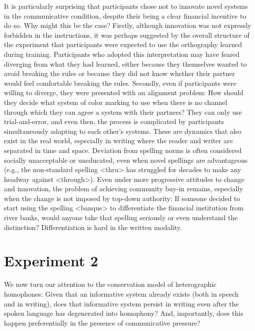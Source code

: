 \documentclass[doc,biblatex]{apa7}
\begin{document}
It is particularly surprising that participants chose not to innovate novel systems in the communicative condition, despite their being a clear financial incentive to do so. Why might this be the case? Firstly, although innovation was not expressly forbidden in the instructions, it was perhaps suggested by the overall structure of the experiment that participants were expected to use the orthography learned during training. Participants who adopted this interpretation may have feared diverging from what they had learned, either because they themselves wanted to avoid breaking the rules or because they did not know whether their partner would feel comfortable breaking the rules. Secondly, even if participants were willing to diverge, they were presented with an alignment problem: How should they decide what system of color marking to use when there is no channel through which they can agree a system with their partners? They can only use trial-and-error, and even then, the process is complicated by participants simultaneously adapting to each other's systems. These are dynamics that also exist in the real world, especially in writing where the reader and writer are separated in time and space. Deviation from spelling norms is often considered socially unacceptable or uneducated, even when novel spellings are advantageous (e.g., the non-standard spelling <thru> has struggled for decades to make any headway against <through>). Even under more progressive attitudes to change and innovation, the problem of achieving community buy-in remains, especially when the change is not imposed by top-down authority: If someone decided to start using the spelling <banque> to differentiate the financial institution from river banks, would anyone take that spelling seriously or even understand the distinction? Differentiation is hard in the written modality.


\section{Experiment 2}

We now turn our attention to the conservation model of heterographic homophones: Given that an informative system already exists (both in speech and in writing), does that informative system persist in writing even after the spoken language has degenerated into homophony? And, importantly, does this happen preferentially in the presence of communicative pressure?
\end{document}
